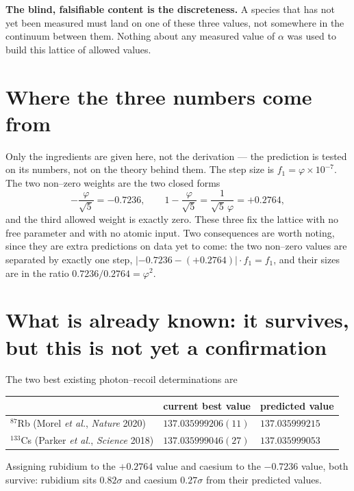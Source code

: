 \documentclass[11pt]{article}
\begin{document}
\noindent\textbf{The blind, falsifiable content is the discreteness.} A species
that has not yet been measured must land on one of these three values, not
somewhere in the continuum between them. Nothing about any measured value of
$\alpha$ was used to build this lattice of allowed values.

\section{Where the three numbers come from}

Only the ingredients are given here, not the derivation --- the prediction is
tested on its numbers, not on the theory behind them. The step size is
$f_1=\varphi\times10^{-7}$. The two non--zero weights are the two closed forms
\begin{equation}
-\frac{\varphi}{\sqrt5}=-0.7236,\qquad
1-\frac{\varphi}{\sqrt5}=\frac{1}{\sqrt5\,\varphi}=+0.2764,
\end{equation}
and the third allowed weight is exactly zero. These three fix the lattice with no
free parameter and with no atomic input. Two consequences are worth noting, since
they are extra predictions on data yet to come: the two non--zero values are
separated by exactly one step, $|{-0.7236}-(+0.2764)|\cdot f_1=f_1$, and their
sizes are in the ratio $0.7236/0.2764=\varphi^2$.

\section{What is already known: it survives, but this is not yet a confirmation}

The two best existing photon--recoil determinations are
\begin{center}
\small\renewcommand{\arraystretch}{1.3}
\begin{tabular}{lll}
\toprule
 & current best value & predicted value\\
\midrule
$^{87}$Rb (Morel \emph{et al.}, \textit{Nature} 2020) & $137.035999206(11)$ & $137.035999215$\\
$^{133}$Cs (Parker \emph{et al.}, \textit{Science} 2018) & $137.035999046(27)$ & $137.035999053$\\
\bottomrule
\end{tabular}
\end{center}
Assigning rubidium to the $+0.2764$ value and caesium to the $-0.7236$ value, both
survive: rubidium sits $0.82\sigma$ and caesium $0.27\sigma$ from their predicted
values.
\end{document}
